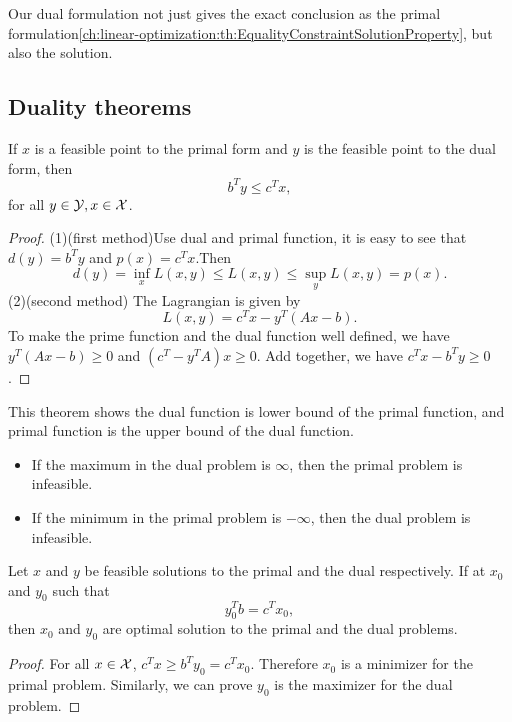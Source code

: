 \begin{refsection}
\begin{remark}
Our dual formulation not just gives the exact conclusion as the primal formulation\autoref{ch:linear-optimization:th:EqualityConstraintSolutionProperty}, but also the solution.
\end{remark}




\subsection{Duality theorems}

\begin{theorem}\cite[146]{bertsimas1997introduction}
If $x$ is a feasible point to the primal form and $y$ is the feasible point to the dual form, then
$$b^T y \leq c^T x,$$
for all $y \in \mathcal{Y},x \in \mathcal{X}$. 
\end{theorem}
\begin{proof}
(1)(first method)Use dual and primal function, it is easy to see that $d(y) = b^Ty$ and $p(x) = c^Tx$.Then
$$d(y) = \inf_x L(x,y) \leq L(x,y) \leq \sup_y L(x,y) = p(x).$$
(2)(second method) The Lagrangian is given by 
$$L(x,y) = c^Tx - y^T(Ax - b).$$
To make the prime function and the dual function well defined, we have $y^T(Ax - b)\geq 0$ and $(c^T - y^TA)x\geq 0$. Add together, we have $c^Tx - b^Ty \geq 0$.
\end{proof}

\begin{remark}[implication]
This theorem shows the dual function is lower bound of the primal function, and primal function is the upper bound of the dual function.
\end{remark}


\begin{corollary}
\begin{itemize}
	\item If the maximum in the dual problem is $\infty$, then the primal problem is infeasible.
	\item If the minimum in the primal problem is $-\infty$, then the dual problem is infeasible.
\end{itemize}
\end{corollary}


\begin{corollary}
Let $x$ and $y$ be feasible solutions to the primal and the dual respectively. If at $x_0$ and $y_0$ such that $$y_0^T b = c^T x_0,$$
then $x_0$ and $y_0$ are optimal solution to the primal and the dual problems.
\end{corollary}
\begin{proof}
For all $x\in \mathcal{X}$, $c^Tx \geq b^Ty_0 = c^Tx_0$. Therefore $x_0$ is a minimizer for the primal problem. Similarly, we can prove $y_0$ is the maximizer for the dual problem.
\end{proof}





\end{refsection}
